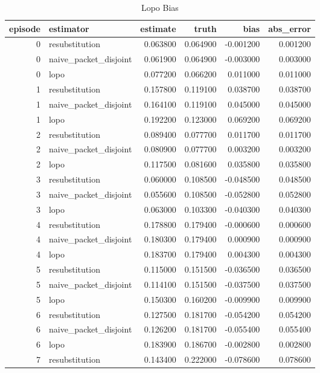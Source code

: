 \begin{table}
\caption{Lopo Bias}
\label{tab_lopo_bias}
\begin{tabular}{rlrrrr}
\toprule
episode & estimator & estimate & truth & bias & abs_error \\
\midrule
0 & resubstitution & 0.063800 & 0.064900 & -0.001200 & 0.001200 \\
0 & naive_packet_disjoint & 0.061900 & 0.064900 & -0.003000 & 0.003000 \\
0 & lopo & 0.077200 & 0.066200 & 0.011000 & 0.011000 \\
1 & resubstitution & 0.157800 & 0.119100 & 0.038700 & 0.038700 \\
1 & naive_packet_disjoint & 0.164100 & 0.119100 & 0.045000 & 0.045000 \\
1 & lopo & 0.192200 & 0.123000 & 0.069200 & 0.069200 \\
2 & resubstitution & 0.089400 & 0.077700 & 0.011700 & 0.011700 \\
2 & naive_packet_disjoint & 0.080900 & 0.077700 & 0.003200 & 0.003200 \\
2 & lopo & 0.117500 & 0.081600 & 0.035800 & 0.035800 \\
3 & resubstitution & 0.060000 & 0.108500 & -0.048500 & 0.048500 \\
3 & naive_packet_disjoint & 0.055600 & 0.108500 & -0.052800 & 0.052800 \\
3 & lopo & 0.063000 & 0.103300 & -0.040300 & 0.040300 \\
4 & resubstitution & 0.178800 & 0.179400 & -0.000600 & 0.000600 \\
4 & naive_packet_disjoint & 0.180300 & 0.179400 & 0.000900 & 0.000900 \\
4 & lopo & 0.183700 & 0.179400 & 0.004300 & 0.004300 \\
5 & resubstitution & 0.115000 & 0.151500 & -0.036500 & 0.036500 \\
5 & naive_packet_disjoint & 0.114100 & 0.151500 & -0.037500 & 0.037500 \\
5 & lopo & 0.150300 & 0.160200 & -0.009900 & 0.009900 \\
6 & resubstitution & 0.127500 & 0.181700 & -0.054200 & 0.054200 \\
6 & naive_packet_disjoint & 0.126200 & 0.181700 & -0.055400 & 0.055400 \\
6 & lopo & 0.183900 & 0.186700 & -0.002800 & 0.002800 \\
7 & resubstitution & 0.143400 & 0.222000 & -0.078600 & 0.078600 \\

\end{tabular}
\end{table}
